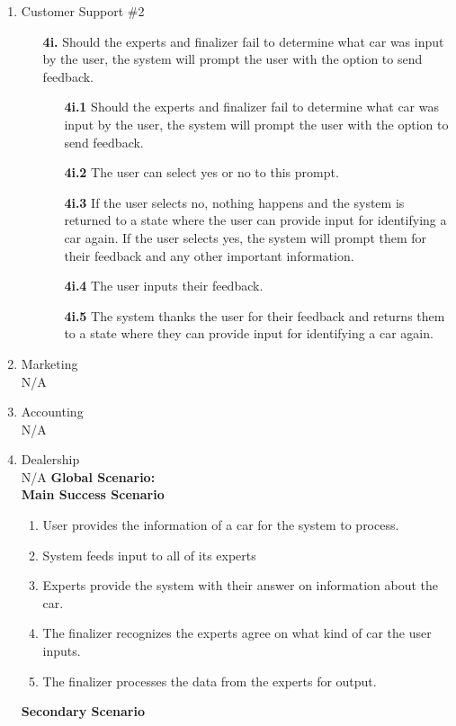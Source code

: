 \documentclass[]{article}
\begin{document}
\begin{enumerate}[{\bf BE1.}]
\begin{enumerate}[\bf VP1.]
		\item Customer Support \#2
		\begin{enumerate}
			\color{red}
			\item[\textbf{4i.}] Should the experts and finalizer fail to determine what car was input by the user, the system will prompt the user with the option to send feedback.
			\begin{enumerate}
				\item[\textbf{4i.1}] Should the experts and finalizer fail to determine what car was input by the user, the system will prompt the user with the option to send feedback.
				\item[\textbf{4i.2}] The user can select yes or no to this prompt.
				\item[\textbf{4i.3}] If the user selects no, nothing happens and the system is returned to a state where the user can provide input for identifying a car again. If the user selects yes, the system will prompt them for their feedback and any other important information.
				\item[\textbf{4i.4}] The user inputs their feedback.
				\item[\textbf{4i.5}] The system thanks the user for their feedback and returns them to a state where they can provide input for identifying a car again.
			\end{enumerate}
		\end{enumerate}
		\item Marketing\\
		N/A
		\item Accounting\\
		N/A
		\item Dealership\\
		N/A
		{\bf Global Scenario:}\\
		\textbf{Main Success Scenario}
		\begin{enumerate}[1.]
			\color{red}
			\item User provides the information of a car for the system to process.
			\item System feeds input to all of its experts
			\item Experts provide the system with their answer on information about the car.
			\item The finalizer recognizes the experts agree on what kind of car the user inputs.
			\item The finalizer processes the data from the experts for output.
		\end{enumerate}
		\textbf{Secondary Scenario}

\end{enumerate}
\end{enumerate}
\end{document}
